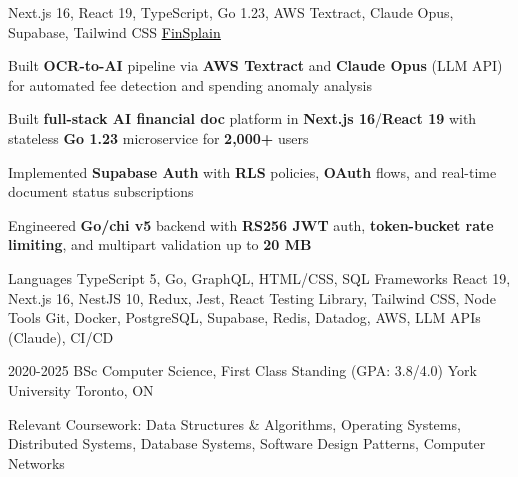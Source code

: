 \documentclass[11pt, a4paper]{awesome-cv}
\begin{document}
\begin{cventries}
\end{cventries}


\begin{cventries}

  \cventry
  {Next.js 16, React 19, TypeScript, Go 1.23, AWS Textract, Claude Opus, Supabase, Tailwind CSS}
  {\href{https://finsplain.net}{\textcolor{black}{\underline{FinSplain}} \faExternalLink}}
  {}
  {}
  {
    \begin{cvitems}
      \item {Built \textbf{OCR-to-AI} pipeline via \textbf{AWS Textract} and \textbf{Claude Opus} (LLM API) for automated fee detection and spending anomaly analysis}
      \item {Built \textbf{full-stack AI financial doc} platform in \textbf{Next.js 16}/\textbf{React 19} with stateless \textbf{Go 1.23} microservice for \textbf{2,000+} users}
      \item {Implemented \textbf{Supabase Auth} with \textbf{RLS} policies, \textbf{OAuth} flows, and real-time document status subscriptions}
      \item {Engineered \textbf{Go/chi v5} backend with \textbf{RS256 JWT} auth, \textbf{token-bucket rate limiting}, and multipart validation up to \textbf{20 MB}}
    \end{cvitems}
  }

\end{cventries}


\begin{cvskills}
  \cvskill
  {Languages}
  {TypeScript 5, Go, GraphQL, HTML/CSS, SQL}
  \cvskill
  {Frameworks}
  {React 19, Next.js 16, NestJS 10, Redux, Jest, React Testing Library, Tailwind CSS, Node}
  \cvskill
  {Tools}
  {Git, Docker, PostgreSQL, Supabase, Redis, Datadog, AWS, LLM APIs (Claude), CI/CD}
\end{cvskills}

\vspace{-2mm}

\begin{cventries}
  \cventry
  {2020-2025}
  {BSc Computer Science, First Class Standing (GPA: 3.8/4.0)}
  {York University}
  {Toronto, ON}
  {%
    \begin{cvitems}
      \item {Relevant Coursework: Data Structures \& Algorithms, Operating Systems, Distributed Systems, Database Systems, Software Design Patterns, Computer Networks}
    \end{cvitems}
  }
\end{cventries}

\end{document}
